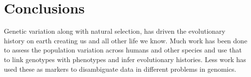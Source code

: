 %
\chapter{Conclusions}

\ifpdf
    \graphicspath{{Chapter5/Figs/Raster/}{Chapter5/Figs/PDF/}{Chapter5/Figs/}}
\else
    \graphicspath{{Chapter5/Figs/Vector/}{Chapter5/Figs/}}
\fi


\par{
Genetic variation along with natural selection, has driven the evolutionary history on earth creating us and all other life we know. Much work has been done to assess the population variation across humans and other species and use that to link genotypes with phenotypes and infer evolutionary histories. Less work has used these as markers to disambiguate data in different problems in genomics.
}
